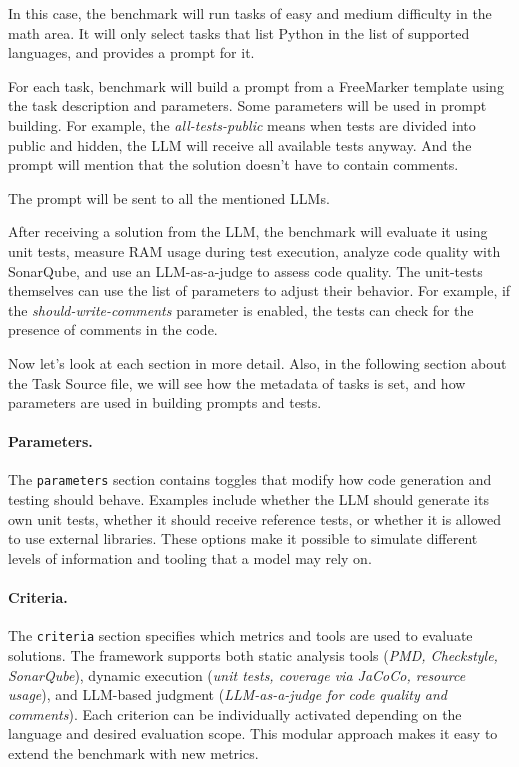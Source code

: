 In this case, the benchmark will run tasks of easy and medium difficulty in the math area.
It will only select tasks that list Python in the list of supported languages, and provides a prompt for it.

For each task, benchmark will build a prompt from a FreeMarker template using the task description and parameters.
Some parameters will be used in prompt building.
For example, the \textit{all-tests-public} means when tests are divided into public and hidden, the LLM will receive all available tests anyway.
And the prompt will mention that the solution doesn't have to contain comments.

The prompt will be sent to all the mentioned LLMs.

After receiving a solution from the LLM, the benchmark will evaluate it using unit tests, measure RAM usage during test execution, analyze code quality with SonarQube, and use an LLM-as-a-judge to assess code quality.
The unit-tests themselves can use the list of parameters to adjust their behavior.
For example, if the \textit{should-write-comments} parameter is enabled, the tests can check for the presence of comments in the code.

Now let's look at each section in more detail.
Also, in the following section about the Task Source file, we will see how the metadata of tasks is set, and how parameters are used in building prompts and tests.

\paragraph{Parameters.}
The \texttt{parameters} section contains toggles that modify how code generation and testing should behave.
Examples include whether the LLM should generate its own unit tests, whether it should receive reference tests, or whether it is allowed to use external libraries.
These options make it possible to simulate different levels of information and tooling that a model may rely on.

\paragraph{Criteria.}
The \texttt{criteria} section specifies which metrics and tools are used to evaluate solutions.
The framework supports both static analysis tools (\emph{PMD, Checkstyle, SonarQube}), dynamic execution (\emph{unit tests, coverage via JaCoCo, resource usage}), and LLM-based judgment (\emph{LLM-as-a-judge for code quality and comments}).
Each criterion can be individually activated depending on the language and desired evaluation scope.
This modular approach makes it easy to extend the benchmark with new metrics.


